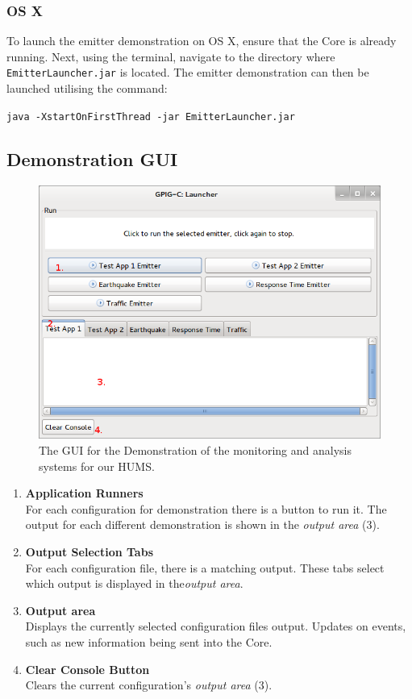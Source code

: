 \documentclass[10pt,a4paper]{article}
\begin{document}
\subsubsection{OS X}
To launch the emitter demonstration on OS X, ensure that the Core is already running. Next, using the terminal, navigate to the directory where \texttt{EmitterLauncher.jar} is located. The emitter demonstration can then be launched utilising the command:
\begin{center}
\texttt{java -XstartOnFirstThread -jar EmitterLauncher.jar}
\end{center}

\subsection{Demonstration GUI}
\begin{figure}[H]
  \centering
  \includegraphics[width=\textwidth]{images/demo-gui.png}
  \caption{The GUI for the Demonstration of the monitoring and analysis systems for our HUMS.}
  \label{fig:demogui}
\end{figure}
\begin{enumerate}
\item \textbf{Application Runners} \\ For each configuration for demonstration there is a button to run it. The output for each different demonstration is shown in the \emph{output area} ($3$).
\item \textbf{Output Selection Tabs} \\ For each configuration file, there is a matching output. These tabs select which output is displayed in the\emph{output area}.
\item \textbf{Output area} \\ Displays the currently selected configuration files output. Updates on events, such as new information being sent into the Core.
\item \textbf{Clear Console Button} \\ 
Clears the current configuration's \emph{output area} ($3$).
\end{enumerate}
\end{document}
